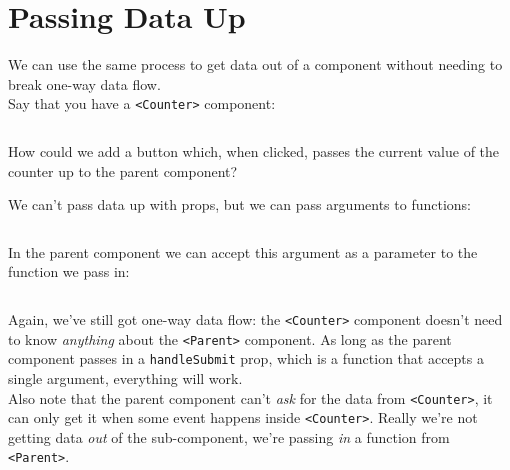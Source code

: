 \section{Passing Data Up}

We can use the same process to get data out of a component without needing to break one-way data flow.
\\

Say that you have a \texttt{<Counter>} component:

\inputminted{js}{05-one-way-data-flow/figures/07-Counter.jsx}

How could we add a button which, when clicked, passes the current value of the counter up to the parent component?


\pagebreak


We can't pass data up with props, but we can pass arguments to functions:

\inputminted{js}{05-one-way-data-flow/figures/08-Counter-with-parent.jsx}

In the parent component we can accept this argument as a parameter to the function we pass in:

\inputminted{js}{05-one-way-data-flow/figures/09-Parent.jsx}

Again, we've still got one-way data flow: the \texttt{<Counter>} component doesn't need to know \textit{anything} about the \texttt{<Parent>} component. As long as the parent component passes in a \texttt{handleSubmit} prop, which is a function that accepts a single argument, everything will work.
\\

Also note that the parent component can't \textit{ask} for the data from \texttt{<Counter>}, it can only get it when some event happens inside \texttt{<Counter>}. Really we're not getting data \textit{out} of the sub-component, we're passing \textit{in} a function from \texttt{<Parent>}.

